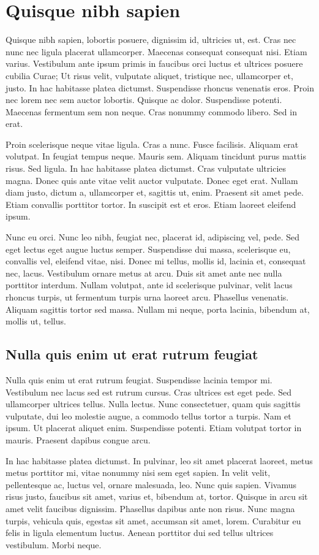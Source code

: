 \documentclass[printmode,mgr,pl]{mgr}
\begin{document}
\chapter{Quisque nibh sapien}
Quisque nibh sapien, lobortis posuere, dignissim id, ultricies ut,
est. Cras nec nunc nec ligula placerat ullamcorper. Maecenas consequat
consequat nisi. Etiam varius. Vestibulum ante ipsum primis in faucibus
orci luctus et ultrices posuere cubilia Curae; Ut risus velit,
vulputate aliquet, tristique nec, ullamcorper et, justo. In hac
habitasse platea dictumst. Suspendisse rhoncus venenatis eros. Proin
nec lorem nec sem auctor lobortis. Quisque ac dolor. Suspendisse
potenti. Maecenas fermentum sem non neque. Cras nonummy commodo
libero. Sed in erat.

Proin scelerisque neque vitae ligula. Cras a nunc. Fusce
facilisis. Aliquam erat volutpat. In feugiat tempus neque. Mauris
sem. Aliquam tincidunt purus mattis risus. Sed ligula. In hac
habitasse platea dictumst. Cras vulputate ultricies magna. Donec quis
ante vitae velit auctor vulputate. Donec eget erat. Nullam diam justo,
dictum a, ullamcorper et, sagittis ut, enim. Praesent sit amet
pede. Etiam convallis porttitor tortor. In suscipit est et eros. Etiam
laoreet eleifend ipsum.

Nunc eu orci. Nunc leo nibh, feugiat nec, placerat id, adipiscing vel,
pede. Sed eget lectus eget augue luctus semper. Suspendisse dui massa,
scelerisque eu, convallis vel, eleifend vitae, nisi. Donec mi tellus,
mollis id, lacinia et, consequat nec, lacus. Vestibulum ornare metus
at arcu. Duis sit amet ante nec nulla porttitor interdum. Nullam
volutpat, ante id scelerisque pulvinar, velit lacus rhoncus turpis, ut
fermentum turpis urna laoreet arcu. Phasellus venenatis. Aliquam
sagittis tortor sed massa. Nullam mi neque, porta lacinia, bibendum
at, mollis ut, tellus.

\section{Nulla quis enim ut erat rutrum feugiat}
Nulla quis enim ut erat rutrum feugiat. Suspendisse lacinia tempor
mi. Vestibulum nec lacus sed est rutrum cursus. Cras ultrices est eget
pede. Sed ullamcorper ultrices tellus. Nulla lectus. Nunc
consectetuer, quam quis sagittis vulputate, dui leo molestie augue, a
commodo tellus tortor a turpis. Nam et ipsum. Ut placerat aliquet
enim. Suspendisse potenti. Etiam volutpat tortor in mauris. Praesent
dapibus congue arcu.

In hac habitasse platea dictumst. In pulvinar, leo sit amet placerat
laoreet, metus metus porttitor mi, vitae nonummy nisi sem eget
sapien. In velit velit, pellentesque ac, luctus vel, ornare malesuada,
leo. Nunc quis sapien. Vivamus risus justo, faucibus sit amet, varius
et, bibendum at, tortor. Quisque in arcu sit amet velit faucibus
dignissim. Phasellus dapibus ante non risus. Nunc magna turpis,
vehicula quis, egestas sit amet, accumsan sit amet, lorem. Curabitur
eu felis in ligula elementum luctus. Aenean porttitor dui sed tellus
ultrices vestibulum. Morbi neque.
\end{document}
